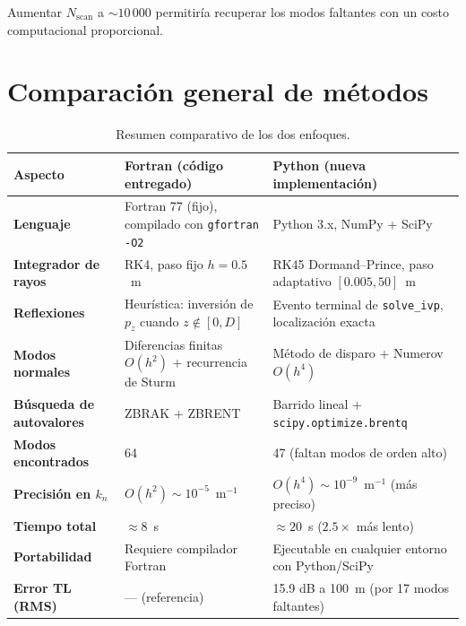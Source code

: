 \documentclass[12pt,a4paper]{article}
\begin{document}
Aumentar $N_{\text{scan}}$ a $\sim 10\,000$ permitiría recuperar los modos
faltantes con un costo computacional proporcional.

\section{Comparación general de métodos}

\begin{table}[H]
\centering
\caption{Resumen comparativo de los dos enfoques.}
\label{tab:comparacion}
\begin{tabular}{p{3.5cm}p{5.5cm}p{5.5cm}}
\toprule
Aspecto & Fortran (código entregado) & Python (nueva implementación) \\
\midrule
\textbf{Lenguaje} &
Fortran 77 (fijo), compilado con \texttt{gfortran -O2} &
Python 3.x, NumPy + SciPy \\[4pt]
\textbf{Integrador de rayos} &
RK4, paso fijo $h=0.5$~m &
RK45 Dormand--Prince, paso adaptativo $[0.005, 50]$~m \\[4pt]
\textbf{Reflexiones} &
Heurística: inversión de $p_z$ cuando $z \notin [0,D]$ &
Evento terminal de \texttt{solve\_ivp}, localización exacta \\[4pt]
\textbf{Modos normales} &
Diferencias finitas $O(h^2)$ + recurrencia de Sturm &
Método de disparo + Numerov $O(h^4)$ \\[4pt]
\textbf{Búsqueda de autovalores} &
\textsc{ZBRAK} + \textsc{ZBRENT} &
Barrido lineal + \texttt{scipy.optimize.brentq} \\[4pt]
\textbf{Modos encontrados} &
64 &
47 (faltan modos de orden alto) \\[4pt]
\textbf{Precisión en $k_n$} &
$O(h^2) \sim 10^{-5}$~m$^{-1}$ &
$O(h^4) \sim 10^{-9}$~m$^{-1}$ (más preciso) \\[4pt]
\textbf{Tiempo total} &
$\approx 8$~s &
$\approx 20$~s ($2.5\times$ más lento) \\[4pt]
\textbf{Portabilidad} &
Requiere compilador Fortran &
Ejecutable en cualquier entorno con Python/SciPy \\[4pt]
\textbf{Error TL (RMS)} &
--- (referencia) &
15.9 dB a 100~m (por 17 modos faltantes) \\
\bottomrule
\end{tabular}
\end{table}

\end{document}
